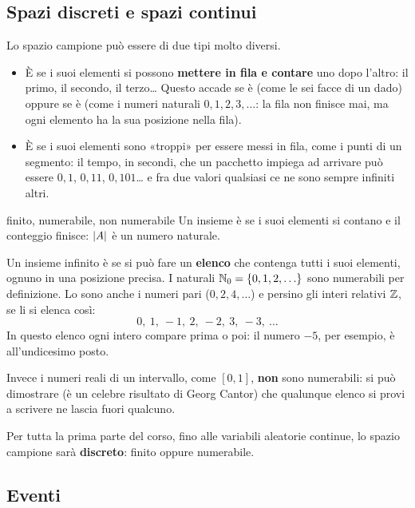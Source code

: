 \subsection{Spazi discreti e spazi continui}

Lo spazio campione può essere di due tipi molto diversi.
\begin{itemize}
  \item È  se i suoi elementi si possono \textbf{mettere in fila e contare} uno dopo l'altro: il primo,
        il secondo, il terzo\ldots{} Questo accade se è  (come le sei facce di un dado) oppure se è
         (come i numeri naturali $0, 1, 2, 3, \ldots$: la fila non finisce mai, ma ogni
        elemento ha la sua posizione nella fila).
  \item È  se i suoi elementi sono «troppi» per essere messi in fila, come i punti di un segmento: il
        tempo, in secondi, che un pacchetto impiega ad arrivare può essere $0{,}1$, $0{,}11$, $0{,}101$\ldots{} e fra due
        valori qualsiasi ce ne sono sempre infiniti altri.
\end{itemize}

\begin{richiamo}{finito, numerabile, non numerabile}
Un insieme è  se i suoi elementi si contano e il conteggio finisce: $\left\lvert A \right\rvert$ è un numero naturale.

Un insieme infinito è  se si può fare un \textbf{elenco} che contenga tutti i suoi elementi, ognuno
in una posizione precisa. I naturali $\mathbb{N}_0 = \{0, 1, 2, \ldots\}$ sono numerabili per definizione. Lo sono anche i
numeri pari ($0, 2, 4, \ldots$) e persino gli interi relativi $\mathbb{Z}$, se li si elenca così:
\[ 0,\ 1,\ -1,\ 2,\ -2,\ 3,\ -3,\ \ldots \]
In questo elenco ogni intero compare prima o poi: il numero $-5$, per esempio, è all'undicesimo posto.

Invece i numeri reali di un intervallo, come $[0, 1]$, \textbf{non} sono numerabili: si può dimostrare (è un celebre
risultato di Georg Cantor) che qualunque elenco si provi a scrivere ne lascia fuori qualcuno.
\end{richiamo}

Per tutta la prima parte del corso, fino alle variabili aleatorie continue, lo spazio campione sarà
\textbf{discreto}: finito oppure numerabile.

\subsection{Eventi}

